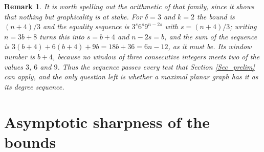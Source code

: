\documentclass[10pt,a4paper]{article}
\newtheorem{remark}[theorem]{Remark}
\begin{document}
\begin{remark}
\label{Rem_misses}It is worth spelling out the arithmetic of that family, since
it shows that nothing but graphicality is at stake. For $\delta =3$ and $k=2$
the bound is $(n+4)/3$ and the equality sequence is $3^{s}6^{s}9^{n-2s}$ with
$s=(n+4)/3$; writing $n=3b+8$ turns this into $s=b+4$ and $n-2s=b$, and the sum
of the sequence is $3(b+4)+6(b+4)+9b=18b+36=6n-12$, as it must be. Its window
number is $b+4$, because no window of three consecutive integers meets two of
the values $3$, $6$ and $9$. Thus the sequence passes every test that Section
\ref{Sec_prelim} can apply, and the only question left is whether a
maximal planar graph has it as its degree sequence.
\end{remark}






%



\section{Asymptotic sharpness of the bounds}
\label{Sec_asym}
\end{document}
